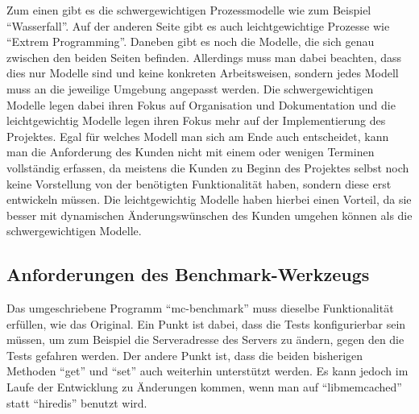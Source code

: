 Zum einen gibt es die schwergewichtigen Prozessmodelle wie zum Beispiel
\enquote{Wasserfall}. Auf der anderen Seite gibt es auch leichtgewichtige
Prozesse wie \enquote{Extrem Programming}. Daneben gibt es noch die Modelle,
die sich genau zwischen den beiden Seiten befinden. Allerdings muss man dabei
beachten, dass dies nur Modelle sind und keine konkreten Arbeitsweisen, sondern
jedes Modell muss an die jeweilige Umgebung angepasst werden. Die
schwergewichtigen Modelle legen dabei ihren Fokus auf Organisation und
Dokumentation und die leichtgewichtig Modelle legen ihren Fokus mehr auf der
Implementierung des Projektes. Egal für welches Modell man sich am Ende auch
entscheidet, kann man die Anforderung des Kunden nicht mit einem oder wenigen
Terminen vollständig erfassen, da meistens die Kunden zu Beginn des Projektes
selbst noch keine Vorstellung von der benötigten Funktionalität haben, sondern
diese erst entwickeln müssen. Die leichtgewichtig Modelle haben hierbei einen
Vorteil, da sie besser mit dynamischen Änderungswünschen des Kunden umgehen
können als die schwergewichtigen Modelle.

\subsection{Anforderungen des Benchmark-Werkzeugs}
Das umgeschriebene Programm \enquote{mc-benchmark} muss dieselbe Funktionalität
erfüllen, wie das Original. Ein Punkt ist dabei, dass die Tests konfigurierbar
sein müssen, um zum Beispiel die Serveradresse des Servers zu ändern, gegen den
die Tests gefahren werden. Der andere Punkt ist, dass die beiden bisherigen
Methoden \enquote{get} und \enquote{set} auch weiterhin unterstützt werden. Es
kann jedoch im Laufe der Entwicklung zu Änderungen kommen, wenn man auf
\enquote{libmemcached} statt \enquote{hiredis} benutzt wird.

